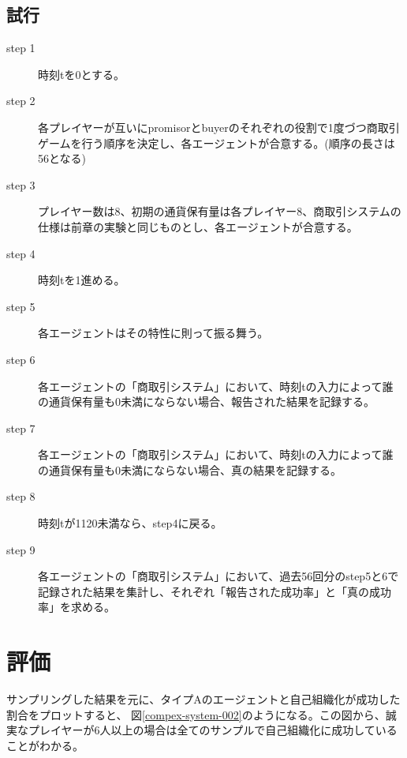   \subsection{試行}
    \begin{description}
      \item[step 1] 時刻tを0とする。
      \item[step 2] 各プレイヤーが互いにpromisorとbuyerのそれぞれの役割で1度づつ商取引ゲームを行う順序を決定し、各エージェントが合意する。(順序の長さは56となる)
      \item[step 3] プレイヤー数は8、初期の通貨保有量は各プレイヤー8、商取引システムの仕様は前章の実験と同じものとし、各エージェントが合意する。
      \item[step 4] 時刻tを1進める。
      \item[step 5] 各エージェントはその特性に則って振る舞う。
      \item[step 6] 各エージェントの「商取引システム」において、時刻tの入力によって誰の通貨保有量も0未満にならない場合、報告された結果を記録する。
      \item[step 7] 各エージェントの「商取引システム」において、時刻tの入力によって誰の通貨保有量も0未満にならない場合、真の結果を記録する。
      \item[step 8] 時刻tが1120未満なら、step4に戻る。
      \item[step 9] 各エージェントの「商取引システム」において、過去56回分のstep5と6で記録された結果を集計し、それぞれ「報告された成功率」と「真の成功率」を求める。
    \end{description}

\section{評価}

サンプリングした結果を元に、タイプAのエージェントと自己組織化が成功した割合をプロットすると、
図\ref{compex-system-002}のようになる。この図から、誠実なプレイヤーが6人以上の場合は全てのサンプルで自己組織化に成功していることがわかる。

